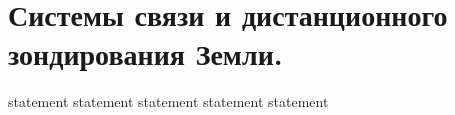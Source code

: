 \chapter{Системы связи и дистанционного зондирования Земли.}

{statement}
{statement}
{statement}
{statement}
{statement}